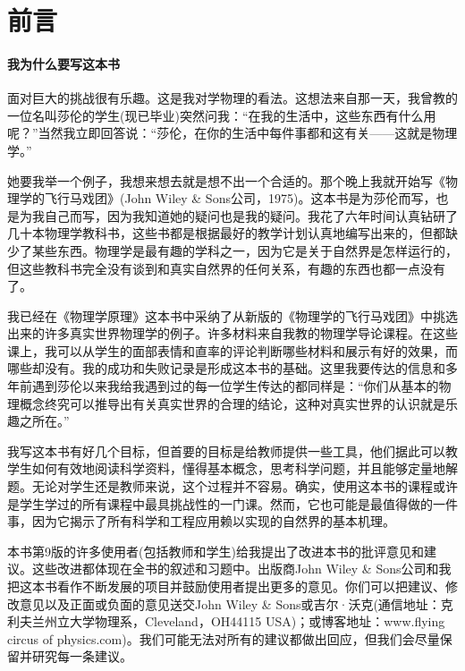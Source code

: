 
\chapter{前言}




\subsubsection*{我为什么要写这本书}


面对巨大的挑战很有乐趣。这是我对学物理的看法。这想法来自那一天，我曾教的一位名叫莎伦的学生(现已毕业)突然问我：“在我的生活中，这些东西有什么用呢？”当然我立即回答说：“莎伦，在你的生活中每件事都和这有关——这就是物理学。”

她要我举一个例子，我想来想去就是想不出一个合适的。那个晚上我就开始写《物理学的飞行马戏团》(John Wiley \& Sons公司，1975)。这本书是为莎伦而写，也是为我自己而写，因为我知道她的疑问也是我的疑问。我花了六年时间认真钻研了几十本物理学教科书，这些书都是根据最好的教学计划认真地编写出来的，但都缺少了某些东西。物理学是最有趣的学科之一，因为它是关于自然界是怎样运行的，但这些教科书完全没有谈到和真实自然界的任何关系，有趣的东西也都一点没有了。

我已经在《物理学原理》这本书中采纳了从新版的《物理学的飞行马戏团》中挑选出来的许多真实世界物理学的例子。许多材料来自我教的物理学导论课程。在这些课上，我可以从学生的面部表情和直率的评论判断哪些材料和展示有好的效果，而哪些却没有。我的成功和失败记录是形成这本书的基础。这里我要传达的信息和多年前遇到莎伦以来我给我遇到过的每一位学生传达的都同样是：“你们从基本的物理概念终究可以推导出有关真实世界的合理的结论，这种对真实世界的认识就是乐趣之所在。”

我写这本书有好几个目标，但首要的目标是给教师提供一些工具，他们据此可以教学生如何有效地阅读科学资料，懂得基本概念，思考科学问题，并且能够定量地解题。无论对学生还是教师来说，这个过程并不容易。确实，使用这本书的课程或许是学生学过的所有课程中最具挑战性的一门课。然而，它也可能是最值得做的一件事，因为它揭示了所有科学和工程应用赖以实现的自然界的基本机理。

本书第9版的许多使用者(包括教师和学生)给我提出了改进本书的批评意见和建议。这些改进都体现在全书的叙述和习题中。出版商John Wiley \& Sons公司和我把这本书看作不断发展的项目并鼓励使用者提出更多的意见。你们可以把建议、修改意见以及正面或负面的意见送交John Wiley \& Sons或吉尔·沃克(通信地址：克利夫兰州立大学物理系，Cleveland，OH44115 USA)；或博客地址：www.flying circus of physics.com)。我们可能无法对所有的建议都做出回应，但我们会尽量保留并研究每一条建议。


